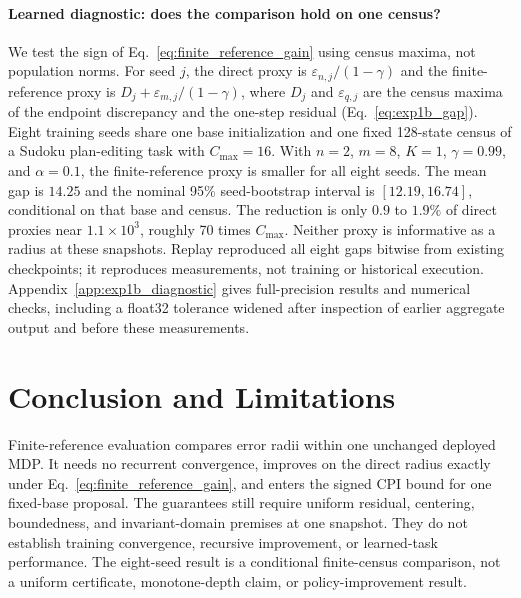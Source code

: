 \documentclass{article}
\theoremstyle{plain}
\theoremstyle{definition}
\theoremstyle{remark}
\begin{document}
\paragraph{Learned diagnostic: does the comparison hold on one census?}
We test the sign of Eq.~\eqref{eq:finite_reference_gain} using census maxima,
not population norms. For seed $j$, the direct proxy is
$\varepsilon_{n,j}/(1-\gamma)$ and the finite-reference proxy is
$D_j+\varepsilon_{m,j}/(1-\gamma)$, where $D_j$ and $\varepsilon_{q,j}$ are
the census maxima of the endpoint discrepancy and the one-step residual
(Eq.~\eqref{eq:exp1b_gap}). Eight training seeds share one base
initialization and one fixed 128-state census of a Sudoku plan-editing task
with $C_{\max}=16$. With $n=2$, $m=8$, $K=1$, $\gamma=0.99$, and
$\alpha=0.1$, the finite-reference proxy is smaller for all eight seeds. The
mean gap is $14.25$ and the nominal 95\% seed-bootstrap interval is
$[12.19,16.74]$, conditional on that base and census. The reduction is only
$0.9$ to $1.9\%$ of direct proxies near $1.1\times10^3$, roughly 70 times
$C_{\max}$. Neither proxy is informative as a radius at these snapshots.
Replay reproduced all eight gaps bitwise from existing checkpoints; it
reproduces measurements, not training or historical execution.
Appendix~\ref{app:exp1b_diagnostic} gives full-precision results and
numerical checks, including a float32 tolerance widened after inspection of
earlier aggregate output and before these measurements.

\section{Conclusion and Limitations}
\label{sec:conclusion}

Finite-reference evaluation compares error radii within one unchanged deployed
MDP. It needs no recurrent convergence, improves on the direct radius exactly
under Eq.~\eqref{eq:finite_reference_gain}, and enters the signed CPI bound for
one fixed-base proposal. The guarantees still require uniform residual,
centering, boundedness, and invariant-domain premises at one snapshot. They do
not establish training convergence, recursive improvement, or learned-task
performance. The eight-seed result is a conditional finite-census comparison,
not a uniform certificate, monotone-depth claim, or policy-improvement result.
\label{sec:main_text_end}


\clearpage
\end{document}
